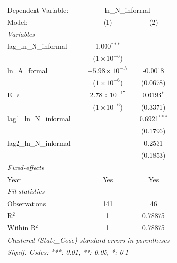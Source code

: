 
\begingroup
\centering
\begin{tabular}{lcc}
   \tabularnewline \midrule \midrule
   Dependent Variable: & \multicolumn{2}{c}{ln\_N\_informal}\\
   Model:                   & (1)                     & (2)\\  
   \midrule
   \emph{Variables}\\
   lag\_ln\_N\_informal     & 1.000$^{***}$           &   \\   
                            & ($1\times 10^{-6}$)     &   \\   
   ln\_A\_formal            & $-5.98\times 10^{-17}$  & -0.0018\\   
                            & ($1\times 10^{-6}$)     & (0.0678)\\   
   E\_s                     & $2.78\times 10^{-17}$   & 0.6193$^{*}$\\   
                            & ($1\times 10^{-6}$)     & (0.3371)\\   
   lag1\_ln\_N\_informal    &                         & 0.6921$^{***}$\\   
                            &                         & (0.1796)\\   
   lag2\_ln\_N\_informal    &                         & 0.2531\\   
                            &                         & (0.1853)\\   
   \midrule
   \emph{Fixed-effects}\\
   Year                     & Yes                     & Yes\\  
   \midrule
   \emph{Fit statistics}\\
   Observations             & 141                     & 46\\  
   R$^2$                    & 1                       & 0.78875\\  
   Within R$^2$             & 1                       & 0.78875\\  
   \midrule \midrule
   \multicolumn{3}{l}{\emph{Clustered (State\_Code) standard-errors in parentheses}}\\
   \multicolumn{3}{l}{\emph{Signif. Codes: ***: 0.01, **: 0.05, *: 0.1}}\\
\end{tabular}
\par\endgroup


